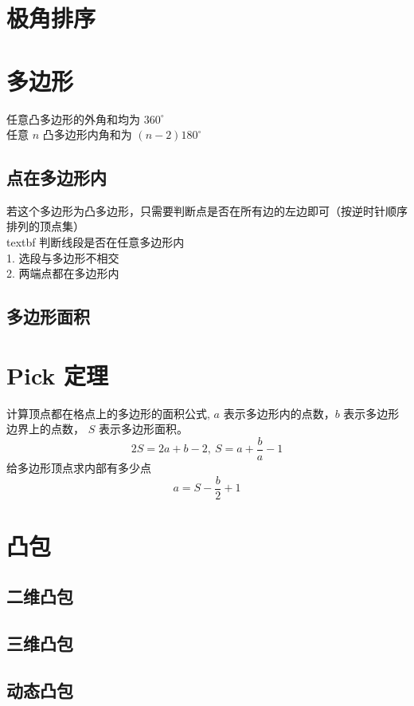 \documentclass{probook}
\begin{document}
\section{极角排序}


\section{多边形} 
任意凸多边形的外角和均为 $360^{\circ}$\\
任意 $n$ 凸多边形内角和为 $(n - 2) 180^{\circ}$
\subsection{点在多边形内}

若这个多边形为凸多边形，只需要判断点是否在所有边的左边即可（按逆时针顺序排列的顶点集）\\
textbf {判断线段是否在任意多边形内}\\
1. 选段与多边形不相交\\
2. 两端点都在多边形内
\subsection{多边形面积} 

\section{Pick 定理}
计算顶点都在格点上的多边形的面积公式, $a$ 表示多边形内的点数，$b$ 表示多边形边界上的点数， $S$ 表示多边形面积。
$$
2S = 2a + b - 2, \ S = a + \dfrac{b}{a} - 1
$$
给多边形顶点求内部有多少点
$$
a = S - \dfrac{b}{2} + 1
$$
\section{凸包} 
\subsection{二维凸包}

\subsection{三维凸包} 

\subsection{动态凸包} 

\end{document}
